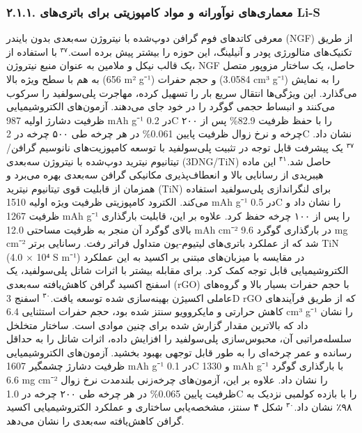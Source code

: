 \documentclass[12pt,a4paper,twocolumn]{article} %
\newcommand{\persian}[1]{\textfarsi{#1}}
\newcommand{\english}[1]{\textenglish{#1}}
\begin{document}
\subsubsection*{\persian{۲.۱.۱. معماری‌های نوآورانه و مواد کامپوزیتی برای باتری‌های \english{Li-S}}}
\persian{
معرفی کاتدهای فوم گرافن دوپ‌شده با نیتروژن سه‌بعدی بدون بایندر (\english{NGF}) از طریق تکنیک‌های متالورژی پودر و آنیلینگ، این حوزه را بیشتر پیش برده است.$^{۳۷}$ با استفاده از یک قالب نیکل و ملامین به عنوان منبع نیتروژن، \english{NGF} حاصل، یک ساختار مزوپور متصل به هم با سطح ویژه بالا (\english{656 m² g⁻¹}) و حجم حفرات (\english{3.0584 cm³ g⁻¹}) را به نمایش می‌گذارد. این ویژگی‌ها انتقال سریع بار را تسهیل کرده، مهاجرت پلی‌سولفید را سرکوب می‌کنند و انبساط حجمی گوگرد را در خود جای می‌دهند. آزمون‌های الکتروشیمیایی ظرفیت دشارژ اولیه \english{987 mAh g⁻¹} در \english{0.2C} را با حفظ ظرفیت \english{82.9\%} پس از ۲۰۰ چرخه و نرخ زوال ظرفیت پایین \english{0.061\%} در هر چرخه طی ۵۰۰ چرخه در \english{2C} نشان داد.$^{۳۷}$
}
\persian{
یک پیشرفت قابل توجه در تثبیت پلی‌سولفید با توسعه کامپوزیت‌های نانوسیم گرافن/تیتانیوم نیترید دوپ‌شده با نیتروژن سه‌بعدی (\english{3DNG/TiN}) حاصل شد.$^{۴۱}$ این ماده هیبریدی از رسانایی بالا و انعطاف‌پذیری مکانیکی گرافن سه‌بعدی بهره می‌برد و همزمان از قابلیت قوی تیتانیوم نیترید (\english{TiN}) برای لنگراندازی پلی‌سولفید استفاده می‌کند. الکترود کامپوزیتی ظرفیت ویژه اولیه \english{1510 mAh g⁻¹} در \english{0.5C} را نشان داد و ظرفیت \english{1267 mAh g⁻¹} را پس از ۱۰۰ چرخه حفظ کرد. علاوه بر این، قابلیت بارگذاری بالای گوگرد آن منجر به ظرفیت مساحتی \english{12.0 mAh cm⁻²} در بارگذاری گوگرد \english{9.6 mg cm⁻²} شد که از عملکرد باتری‌های لیتیوم-یون متداول فراتر رفت. رسانایی برتر \english{TiN} (\english{4.0 × 10⁴ S m⁻¹}) در مقایسه با میزبان‌های مبتنی بر اکسید به این عملکرد الکتروشیمیایی قابل توجه کمک کرد.
}
\persian{
برای مقابله بیشتر با اثرات شاتل پلی‌سولفید، یک اسفنج اکسید گرافن کاهش‌یافته سه‌بعدی (\english{rGO}) با حجم حفرات بسیار بالا و گروه‌های عاملی اکسیژن بهینه‌سازی شده توسعه یافت.$^{۳۰}$ اسفنج \english{3D rGO} که از طریق فرآیندهای کاهش حرارتی و مایکروویو سنتز شده بود، حجم حفرات استثنایی \english{6.4 cm³ g⁻¹} را نشان داد که بالاترین مقدار گزارش شده برای چنین موادی است. ساختار متخلخل سلسله‌مراتبی آن، محبوس‌سازی پلی‌سولفید را افزایش داده، اثرات شاتل را به حداقل رسانده و عمر چرخه‌ای را به طور قابل توجهی بهبود بخشید. آزمون‌های الکتروشیمیایی ظرفیت دشارژ چشمگیر \english{1607 mAh g⁻¹} در \english{0.1C} و \english{1330 mAh g⁻¹} با بارگذاری گوگرد \english{6.6 mg cm⁻²} را نشان داد. علاوه بر این، آزمون‌های چرخه‌زنی بلندمدت نرخ زوال ظرفیت پایین \english{0.065\%} در هر چرخه طی ۲۰۰ چرخه در \english{1.0C} را با بازده کولمبی نزدیک به ۹۸٪ نشان داد.$^{۳۰}$ شکل ۴ سنتز، مشخصه‌یابی ساختاری و عملکرد الکتروشیمیایی اکسید گرافن کاهش‌یافته سه‌بعدی را نشان می‌دهد.
}
\end{document}
